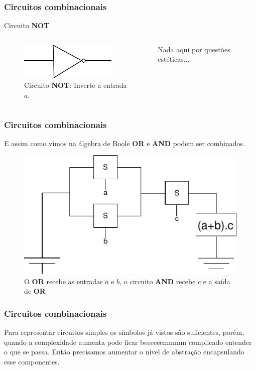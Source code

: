 \begin{frame}
	\frametitle{Circuitos combinacionais}
	\par Circuito \textbf{NOT}
	\begin{columns}
		\begin{figure}
			\centering
			\includegraphics[width=0.7\linewidth]{images/portaNao}
			\caption{Circuito \textbf{NOT}: Inverte a entrada $a$.}
			\label{fig:portanao}
		\end{figure}
		
		\par Nada aqui por questões estéticas...
	\end{columns}
\end{frame}

\begin{frame}
	\frametitle{Circuitos combinacionais}
	\par E assim como vimos na álgebra de Boole \textbf{OR} e \textbf{AND} podem ser combinados.
	\begin{figure}
		\centering
		\includegraphics[width=0.7\linewidth]{images/aMaisBVezesC}
		\caption{O \textbf{OR} recebe as entradas $a$ e $b$, o circuito \textbf{AND} recebe $c$ e a saída de \textbf{OR}}
		\label{fig:amaisbvezesc}
	\end{figure}
\end{frame}

\begin{frame}
	\frametitle{Circuitos combinacionais}
	\par Para representar circuitos simples os símbolos já vistos são suficientes, porém, quando a complexidade aumenta pode ficar beeeeeemmmm complicado entender o que se passa. Então precisamos aumentar o nível de abstração encapsulando esse componentes.
\end{frame}

